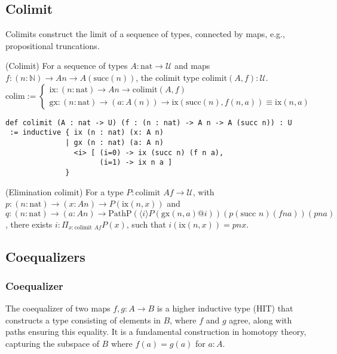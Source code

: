\documentclass{article}
\begin{document}
\newpage
\subsection{Colimit}
Colimits construct the limit of a sequence of types, connected by maps,
e.g., propositional truncations.

\begin{definition} (Colimit)
For a sequence of types \( A : \text{nat} \to \mathcal{U} \) and
maps \( f : (n : \mathbb{N}) \to A n \to A(\text{succ}(n)) \),
the colimit type \( \text{colimit}(A,f) : \mathcal{U} \).
\[
\text{colim} :=
\begin{cases}
\text{ix} : (n : \text{nat}) \to A n \to \text{colimit}(A,f) \\
\text{gx} : (n : \text{nat}) \to (a : A(n)) \to \text{ix} (\text{succ}(n),f(n,a)) \equiv \text{ix}(n,a)
\end{cases}
\]
\begin{lstlisting}
def colimit (A : nat -> U) (f : (n : nat) -> A n -> A (succ n)) : U
 := inductive { ix (n : nat) (x: A n)
              | gx (n : nat) (a: A n)
                <i> [ (i=0) -> ix (succ n) (f n a),
                      (i=1) -> ix n a ]
              }
\end{lstlisting}
\end{definition}

\begin{theorem} (Elimination \( \text{colimit} \))
For a type \( P : \text{colimit } A f \to \mathcal{U} \),
with \( p : (n : \text{nat}) \to (x : A n) \to P(\text{ix}(n, x)) \)
and \( q : (n : \text{nat}) \to (a : A n) \to \text{PathP} (\langle i \rangle P(\text{gx}(n, a) @ i)) (p (\text{succ } n) (f n a)) (p n a) \),
there exists \( i : \Pi_{x:\text{colimit } A f} P(x) \), such that \( i(\text{ix}(n, x)) = p n x \).
\end{theorem}

\newpage
\subsection{Coequalizers}
\subsubsection*{Coequalizer}
The coequalizer of two maps \( f, g : A \to B \) is a higher inductive
type (HIT) that constructs a type consisting of elements in \( B \),
where \( f \) and \( g \) agree, along with paths ensuring this equality.
It is a fundamental construction in homotopy theory,
capturing the subspace of \( B \) where \( f(a) = g(a) \) for \( a : A \).
\end{document}
